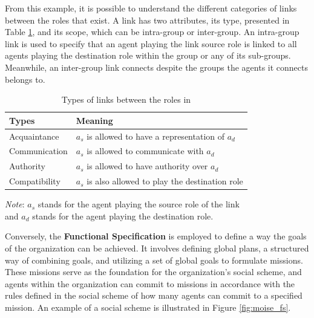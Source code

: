 From this example, it is possible to understand the different categories of links between the roles that exist. A link has two attributes, its type, presented in Table \ref{tab:types_of_links_in_moise}, and its scope, which can be intra-group or inter-group. An intra-group link is used to specify that an agent playing the link source role is linked to all agents playing the destination role within the group or any of its sub-groups. Meanwhile, an inter-group link connects despite the groups the agents it connects belongs to.

\def \sourceagent{$a_s$ }
\def \destagent{$a_d$ }

\begin{table}[!htbp]
    \begin{minipage}{\columnwidth}
        \centering
        \begin{tabular}{l l}
            \toprule
            Types         & Meaning                                                        \\
            \midrule
            Acquaintance  & \sourceagent is allowed to have a representation of \destagent \\
            Communication & \sourceagent is allowed to communicate with \destagent         \\
            Authority     & \sourceagent is allowed to have authority over \destagent      \\
            Compatibility & \sourceagent is also allowed to play the destination role      \\
            \bottomrule
        \end{tabular}
        \begin{center}
            \footnotesize 
            \emph{Note}: \sourceagent stands for the agent playing the source role of the link \\
            and \destagent stands for the agent playing the destination role. \\   
        \end{center}
    \end{minipage}
    \caption{Types of links between the roles in \MOISEp}
    \label{tab:types_of_links_in_moise}
\end{table}

Conversely, the \textbf{Functional Specification} is employed to define a way the goals of the organization can be achieved. It involves defining global plans, a structured way of combining goals, and utilizing a set of global goals to formulate missions. These missions serve as the foundation for the organization's social scheme, and agents within the organization can commit to missions in accordance with the rules defined in the social scheme of how many agents can commit to a specified mission. An example of a social scheme is illustrated in Figure \ref{fig:moise_fs}.

